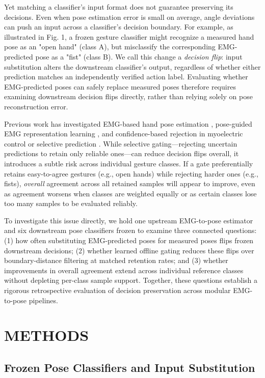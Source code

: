 \documentclass[conference,letterpaper]{IEEEtran}
\begin{document}
Yet matching a classifier's input format does not guarantee preserving its decisions. Even when pose estimation error is small on average, angle deviations can push an input across a classifier's decision boundary. For example, as illustrated in Fig. 1, a frozen gesture classifier might recognize a measured hand pose as an "open hand" (class A), but misclassify the corresponding EMG-predicted pose as a "fist" (class B). We call this change a \textit{decision flip}: input substitution alters the downstream classifier's output, regardless of whether either prediction matches an independently verified action label. Evaluating whether EMG-predicted poses can safely replace measured poses therefore requires examining downstream decision flips directly, rather than relying solely on pose reconstruction error.

Previous work has investigated EMG-based hand pose estimation \cite{ref1}, pose-guided EMG representation learning \cite{ref2, ref3}, and confidence-based rejection in myoelectric control or selective prediction \cite{ref4, ref5, ref6}. While selective gating---rejecting uncertain predictions to retain only reliable ones---can reduce decision flips overall, it introduces a subtle risk across individual gesture classes. If a gate preferentially retains easy-to-agree gestures (e.g., open hands) while rejecting harder ones (e.g., fists), \textit{overall} agreement across all retained samples will appear to improve, even as agreement worsens when classes are weighted equally or as certain classes lose too many samples to be evaluated reliably.

To investigate this issue directly, we hold one upstream EMG-to-pose estimator \cite{ref1} and six downstream pose classifiers \cite{ref7,ref8,ref9,ref10} frozen to examine three connected questions: (1) how often substituting EMG-predicted poses for measured poses flips frozen downstream decisions; (2) whether learned offline gating reduces these flips over boundary-distance filtering at matched retention rates; and (3) whether improvements in overall agreement extend across individual reference classes without depleting per-class sample support. Together, these questions establish a rigorous retrospective evaluation of decision preservation across modular EMG-to-pose pipelines.

\section{METHODS}

\subsection{Frozen Pose Classifiers and Input Substitution}
\end{document}
